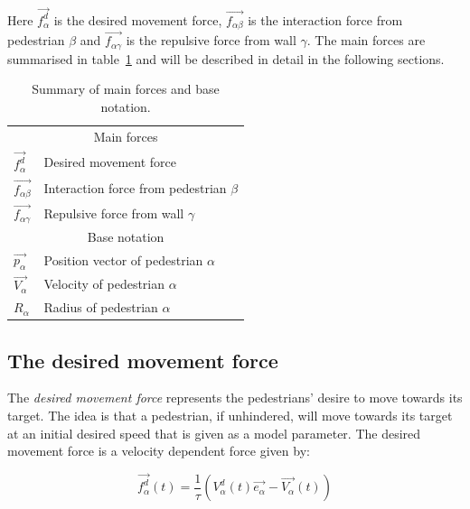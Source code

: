 Here $\overrightarrow{f_{\alpha}^{d}}$ is the desired movement force,  
$\overrightarrow{f_{\alpha \beta}}$ is the interaction force from pedestrian 
$\beta$ and $\overrightarrow{f_{\alpha \gamma}}$ is the repulsive force from 
wall $\gamma$. The main forces are summarised in table~\ref{tbl:main-forces} 
and will be described in detail in the following sections.

\begin{table}[h]
    \centering
    \begin{tabular}{l l}
        \toprule
        \multicolumn{2}{c}{\textsf{Main forces}}\\
        $\overrightarrow{f_{\alpha}^{d}}$ & Desired movement force\\
        $\overrightarrow{f_{\alpha \beta}}$ & Interaction force from pedestrian 
        $\beta$\\
        $\overrightarrow{f_{\alpha \gamma}}$ & Repulsive force from wall 
        $\gamma$\\
        \midrule
        \multicolumn{2}{c}{\textsf{Base notation}}\\
        $\overrightarrow{p_{\alpha}}$ & Position vector of pedestrian 
        $\alpha$\\
        $\overrightarrow{V_{\alpha}}$ & Velocity of pedestrian $\alpha$ \\ 
        \addlinespace[0.3em]
        $R_\alpha$ & Radius of pedestrian $\alpha$\\
        \bottomrule
    \end{tabular}
    \caption{Summary of main forces and base notation.}
    \label{tbl:main-forces}
\end{table}

\subsection{The desired movement force}
\label{sec:desired-force}
The \emph{desired movement force} represents the pedestrians' desire to move towards its 
target. The idea is that a pedestrian, if unhindered, will move towards its 
target at an initial desired speed that is given as a model parameter. The 
desired movement force is a velocity dependent force given by:

\begin{equation}\label{eqn:desired-force}
	\overrightarrow{f^{d}_{\alpha}} (t) =
    \frac{1}{\tau}
    \left( V_{\alpha}^{d}(t) \overrightarrow{e_{\alpha}} - 
    \overrightarrow{V_{\alpha}}(t) \right)
\end{equation}

